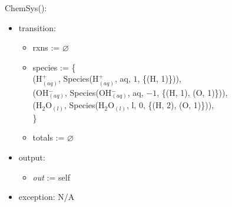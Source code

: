 \documentclass[12pt, titlepage]{article}
\begin{document}
\noindent ChemSys():
\begin{itemize}
\item transition: \begin{itemize} 
                  \item[] rxns := $\varnothing$
                  \item[] species := \{ \\
                  \hspace*{2em} (H$^+_{(aq)}$, Species(H$^+_{(aq)}$, aq, $1$, \{(H, 1)\})),\\
                  \hspace*{2em} (OH$^-_{(aq)}$, Species(OH$^-_{(aq)}$, aq, $-1$, \{(H, 1), (O, 1)\})),\\
                  \hspace*{2em} (H$_2$O$_{(l)}$, Species(H$_2$O$_{(l)}$, l, $0$, \{(H, 2), (O, 1)\})),\\
                  \} 
                  \item[] totals := $\varnothing$
                  \end{itemize}
\item output: \begin{itemize} 
              \item[] \emph{out} := self 
              \end{itemize}
\item exception: N/A
\end{itemize}
\end{document}
